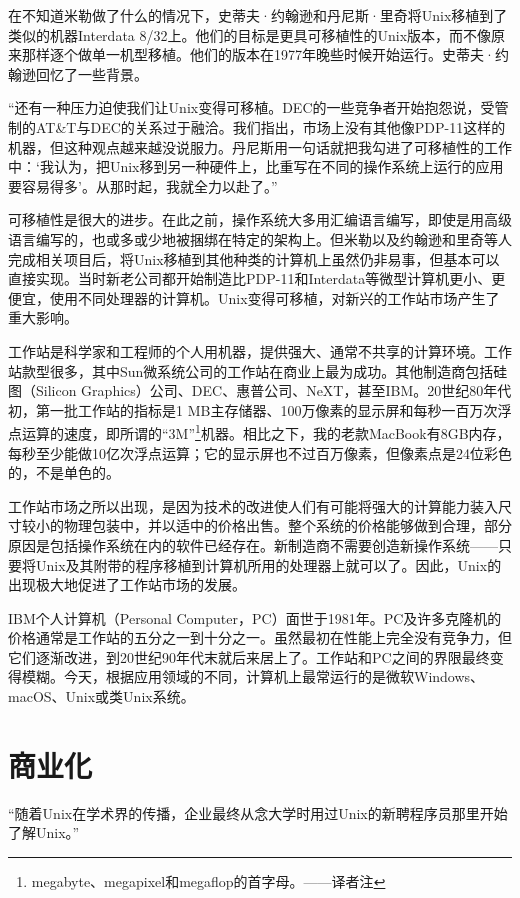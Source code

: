 \documentclass[a4paper,12pt,UTF8,twoside]{ctexbook}
\begin{document}
在不知道米勒做了什么的情况下，史蒂夫·约翰逊和丹尼斯·里奇将Unix移植到了类似的机器Interdata 8/32上。他们的目标是更具可移植性的Unix版本，而不像原来那样逐个做单一机型移植。他们的版本在1977年晚些时候开始运行。史蒂夫·约翰逊回忆了一些背景。

“还有一种压力迫使我们让Unix变得可移植。DEC的一些竞争者开始抱怨说，受管制的AT\&T与DEC的关系过于融洽。我们指出，市场上没有其他像PDP-11这样的机器，但这种观点越来越没说服力。丹尼斯用一句话就把我勾进了可移植性的工作中：‘我认为，把Unix移到另一种硬件上，比重写在不同的操作系统上运行的应用要容易得多’。从那时起，我就全力以赴了。”

可移植性是很大的进步。在此之前，操作系统大多用汇编语言编写，即使是用高级语言编写的，也或多或少地被捆绑在特定的架构上。但米勒以及约翰逊和里奇等人完成相关项目后，将Unix移植到其他种类的计算机上虽然仍非易事，但基本可以直接实现。当时新老公司都开始制造比PDP-11和Interdata等微型计算机更小、更便宜，使用不同处理器的计算机。Unix变得可移植，对新兴的工作站市场产生了重大影响。

工作站是科学家和工程师的个人用机器，提供强大、通常不共享的计算环境。工作站款型很多，其中Sun微系统公司的工作站在商业上最为成功。其他制造商包括硅图（Silicon Graphics）公司、DEC、惠普公司、NeXT，甚至IBM。20世纪80年代初，第一批工作站的指标是1 MB主存储器、100万像素的显示屏和每秒一百万次浮点运算的速度，即所谓的“3M”\footnote{megabyte、megapixel和megaflop的首字母。——译者注}机器。相比之下，我的老款MacBook有8GB内存，每秒至少能做10亿次浮点运算；它的显示屏也不过百万像素，但像素点是24位彩色的，不是单色的。

工作站市场之所以出现，是因为技术的改进使人们有可能将强大的计算能力装入尺寸较小的物理包装中，并以适中的价格出售。整个系统的价格能够做到合理，部分原因是包括操作系统在内的软件已经存在。新制造商不需要创造新操作系统——只要将Unix及其附带的程序移植到计算机所用的处理器上就可以了。因此，Unix的出现极大地促进了工作站市场的发展。

IBM个人计算机（Personal Computer，PC）面世于1981年。PC及许多克隆机的价格通常是工作站的五分之一到十分之一。虽然最初在性能上完全没有竞争力，但它们逐渐改进，到20世纪90年代末就后来居上了。工作站和PC之间的界限最终变得模糊。今天，根据应用领域的不同，计算机上最常运行的是微软Windows、macOS、Unix或类Unix系统。

\chapter{商业化}

“随着Unix在学术界的传播，企业最终从念大学时用过Unix的新聘程序员那里开始了解Unix。”
\end{document}
